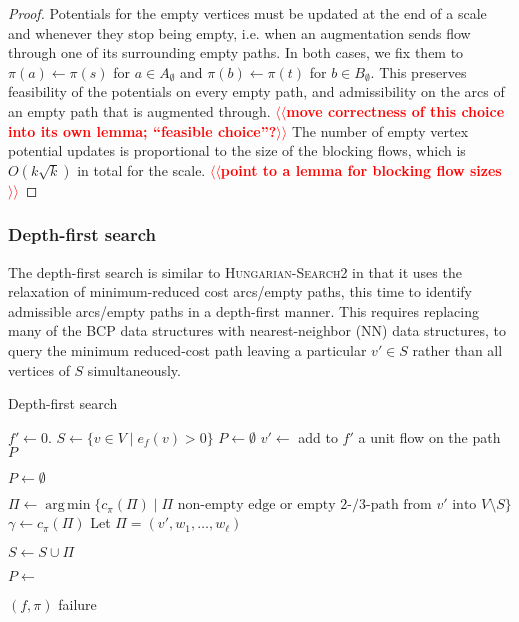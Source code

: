 \documentclass[11pt]{article}
\makeatletter
\DeclareMathOperator*{\argmin}{arg\,min}
\theoremstyle{plain}
\numberwithin{figure}{section}
\def\n@te#1{\textsf{\boldmath \textbf{$\langle\!\langle$#1$\rangle\!\rangle$}}\leavevmode}
\def\note#1{\textcolor{red}{\n@te{#1}}}
\makeatother
\begin{document}
\begin{proof}
Potentials for the empty vertices must be updated at the end of a scale and
whenever they stop being empty, i.e. when an augmentation sends flow through
one of its surrounding empty paths.
In both cases, we fix them to $\pi(a) \gets \pi(s)$ for $a \in A_\emptyset$ and
$\pi(b) \gets \pi(t)$ for $b \in B_\emptyset$.
This preserves feasibility of the potentials on every empty path, and
admissibility on the arcs of an empty path that is augmented through.
\note{move correctness of this choice into its own lemma; ``feasible choice''?}
The number of empty vertex potential updates is proportional to the size of
the blocking flows, which is $O(k\sqrt{k})$ in total for the scale.
\note{point to a lemma for blocking flow sizes}
\end{proof}

\subsubsection{Depth-first search}

The depth-first search is similar to \textsc{Hungarian-Search2} in that it
uses the relaxation of minimum-reduced cost arcs/empty paths, this time to
identify admissible arcs/empty paths in a depth-first manner.
This requires replacing many of the BCP data structures with nearest-neighbor
(NN) data structures, to query the minimum reduced-cost path leaving a
particular $v' \in S$ rather than all vertices of $S$ simultaneously.

\begin{algorithm}
\caption{Depth-first search}
\begin{algorithmic}[1]
	\State $f' \gets 0$.
	\State $S \gets \{v \in V \mid e_f(v) > 0\}$
	\State $P \gets \emptyset$
	\Repeat
		\State $v' \gets$ 
			\State add to $f'$ a unit flow on the path $P$

			\State $P \gets \emptyset$
		\EndIf

		\Statex %
		\State $\Pi \gets \argmin\{c_\pi(\Pi) \mid \text{$\Pi$ non-empty edge or empty 2-/3-path from $v'$ into $V \setminus S$}\}$
		\State $\gamma \gets c_\pi(\Pi)$
		\State Let $\Pi = (v', w_1, \ldots, w_\ell)$

		\Statex %
			\State $S \gets S \cup \Pi$

			\State $P \gets$ 
		\EndIf

		 
			\State\Return $(f, \pi)$
		\EndIf
	\State\Return failure
\EndFunction
\end{algorithmic}
\end{algorithm}
\end{document}
